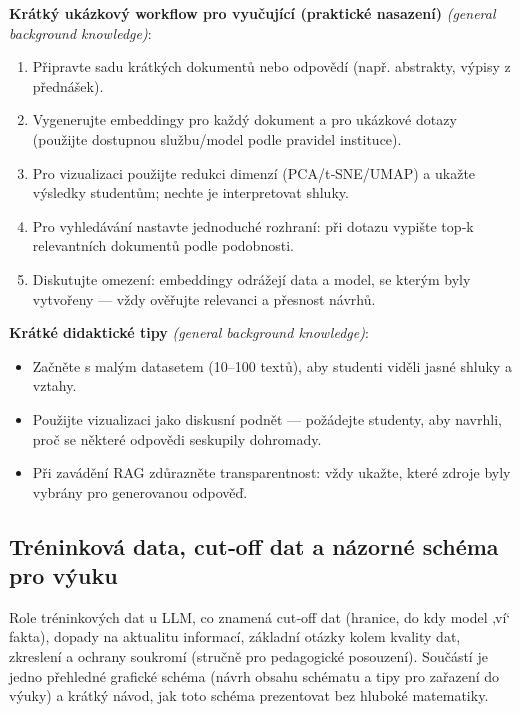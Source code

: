 \documentclass{report}%
\begin{document}
\noindent\textbf{Krátký ukázkový workflow pro vyučující (praktické nasazení)} \emph{(general background knowledge)}:
\begin{enumerate}
  \item Připravte sadu krátkých dokumentů nebo odpovědí (např. abstrakty, výpisy z přednášek).
  \item Vygenerujte embeddingy pro každý dokument a pro ukázkové dotazy (použijte dostupnou službu/model podle pravidel instituce).
  \item Pro vizualizaci použijte redukci dimenzí (PCA/t‑SNE/UMAP) a ukažte výsledky studentům; nechte je interpretovat shluky.
  \item Pro vyhledávání nastavte jednoduché rozhraní: při dotazu vypište top‑k relevantních dokumentů podle podobnosti.
  \item Diskutujte omezení: embeddingy odrážejí data a model, se kterým byly vytvořeny — vždy ověřujte relevanci a přesnost návrhů.
\end{enumerate}

\noindent\textbf{Krátké didaktické tipy} \emph{(general background knowledge)}:
\begin{itemize}
  \item Začněte s malým datasetem (10–100 textů), aby studenti viděli jasné shluky a vztahy.
  \item Použijte vizualizaci jako diskusní podnět — požádejte studenty, aby navrhli, proč se některé odpovědi seskupily dohromady.
  \item Při zavádění RAG zdůrazněte transparentnost: vždy ukažte, které zdroje byly vybrány pro generovanou odpověď.
\end{itemize}%

%
\subsection{Tréninková data, cut‑off dat a názorné schéma pro výuku}%
Role tréninkových dat u LLM, co znamená cut‑off dat (hranice, do kdy model ‚ví‘ fakta), dopady na aktualitu informací, základní otázky kolem kvality dat, zkreslení a ochrany soukromí (stručně pro pedagogické posouzení). Součástí je jedno přehledné grafické schéma (návrh obsahu schématu a tipy pro zařazení do výuky) a krátký návod, jak toto schéma prezentovat bez hluboké matematiky.%
\end{document}
